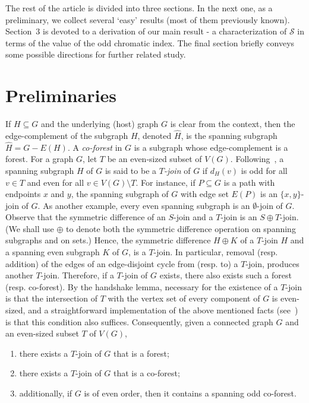 \documentclass[a4paper,12pt]{article}
\numberwithin{equation}{section}
\begin{document}
\medskip

The rest of the article is divided into three sections. In the next one, as a preliminary, we collect several `easy' results (most of them previously known). Section~$3$ is devoted to a derivation of our main result - a characterization of $\mathcal{S}$ in terms of the value of the odd chromatic index. The final section briefly conveys some possible directions for further related study.


\section{Preliminaries}

If $H\subseteq G$ and the underlying (host) graph $G$ is clear from the context, then the edge-complement of the subgraph $H$, denoted  $\hat{H}$, is the spanning subgraph $\hat{H}=G-E(H)$.
A \textit{co-forest} in $G$ is a subgraph whose edge-complement is a forest.
For a graph $G$, let $T$ be an even-sized subset of $V(G)$. Following~\cite{BonMur08}, a spanning subgraph $H$ of $G$ is said to be a \textit{$T$-join} of $G$ if $d_{H}(v)$ is odd for all $v\in T$ and even for all $v\in V(G)\setminus T$. For instance, if $P\subseteq G$ is a path with endpoints $x$ and $y$, the spanning subgraph of $G$ with edge set $E(P)$ is an $\{x,y\}$-join of $G$. As another example, every even spanning subgraph is an $\emptyset$-join of $G$. Observe that the symmetric difference of an $S$-join and a $T$-join is an $S\oplus T$-join. (We shall use $\oplus$ to denote both the symmetric difference operation on spanning subgraphs and on sets.) Hence, the symmetric difference $H\oplus K$ of a $T$-join $H$ and a spanning even subgraph $K$ of $G$, is a $T$-join. In particular, removal (resp. addition) of the edges of an edge-disjoint cycle from (resp. to) a $T$-join, produces another $T$-join. Therefore, if a $T$-join of $G$ exists, there also exists such a forest (resp. co-forest). By the handshake lemma, necessary for the existence of a $T$-join is that the intersection of $T$ with the vertex set of every component of $G$ is even-sized, and a straightforward implementation of the  above mentioned facts (see~\cite{Sch03}) is that this condition also suffices. Consequently, given a connected graph $G$ and an even-sized subset $T$ of $V(G)$,
\begin{enumerate}
\item[$(1)$] there exists a $T$-join of $G$ that is a forest;
\item[$(2)$] there exists a $T$-join of $G$ that is a co-forest;
\item[$(3)$] additionally, if $G$ is of even order, then it contains a spanning odd co-forest.
\end{enumerate}
\end{document}

